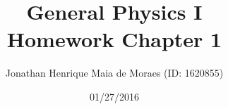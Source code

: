 \title{General Physics I \\ Homework Chapter 1}
\author{Jonathan Henrique Maia de Moraes (ID: 1620855)}
\date{01/27/2016}
\maketitle

